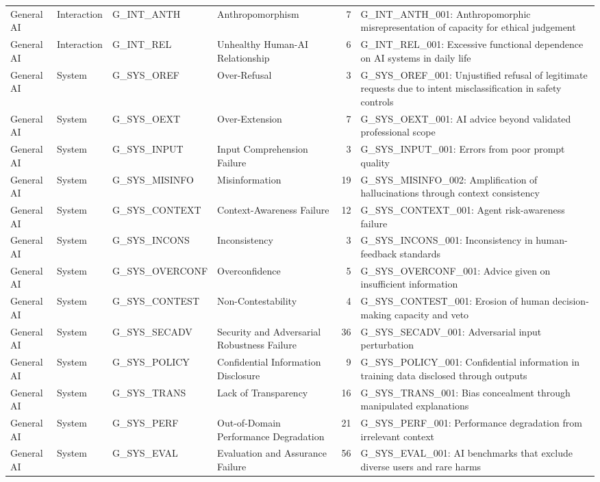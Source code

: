 \begin{longtable}{L{0.09\textwidth}L{0.11\textwidth}L{0.15\textwidth}L{0.23\textwidth}rL{0.24\textwidth}}
General AI & Interaction & G\_INT\_ANTH & Anthropomorphism & 7 & G\_INT\_ANTH\_001: Anthropomorphic misrepresentation of capacity for ethical judgement \\
General AI & Interaction & G\_INT\_REL & Unhealthy Human-AI Relationship & 6 & G\_INT\_REL\_001: Excessive functional dependence on AI systems in daily life \\
General AI & System & G\_SYS\_OREF & Over-Refusal & 3 & G\_SYS\_OREF\_001: Unjustified refusal of legitimate requests due to intent misclassification in safety controls \\
General AI & System & G\_SYS\_OEXT & Over-Extension & 7 & G\_SYS\_OEXT\_001: AI advice beyond validated professional scope \\
General AI & System & G\_SYS\_INPUT & Input Comprehension Failure & 3 & G\_SYS\_INPUT\_001: Errors from poor prompt quality \\
General AI & System & G\_SYS\_MISINFO & Misinformation & 19 & G\_SYS\_MISINFO\_002: Amplification of hallucinations through context consistency \\
General AI & System & G\_SYS\_CONTEXT & Context-Awareness Failure & 12 & G\_SYS\_CONTEXT\_001: Agent risk-awareness failure \\
General AI & System & G\_SYS\_INCONS & Inconsistency & 3 & G\_SYS\_INCONS\_001: Inconsistency in human-feedback standards \\
General AI & System & G\_SYS\_OVERCONF & Overconfidence & 5 & G\_SYS\_OVERCONF\_001: Advice given on insufficient information \\
General AI & System & G\_SYS\_CONTEST & Non-Contestability & 4 & G\_SYS\_CONTEST\_001: Erosion of human decision-making capacity and veto \\
General AI & System & G\_SYS\_SECADV & Security and Adversarial Robustness Failure & 36 & G\_SYS\_SECADV\_001: Adversarial input perturbation \\
General AI & System & G\_SYS\_POLICY & Confidential Information Disclosure & 9 & G\_SYS\_POLICY\_001: Confidential information in training data disclosed through outputs \\
General AI & System & G\_SYS\_TRANS & Lack of Transparency & 16 & G\_SYS\_TRANS\_001: Bias concealment through manipulated explanations \\
General AI & System & G\_SYS\_PERF & Out-of-Domain Performance Degradation & 21 & G\_SYS\_PERF\_001: Performance degradation from irrelevant context \\
General AI & System & G\_SYS\_EVAL & Evaluation and Assurance Failure & 56 & G\_SYS\_EVAL\_001: AI benchmarks that exclude diverse users and rare harms \\

\end{longtable}
